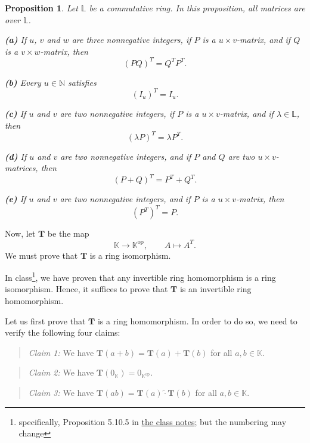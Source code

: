 \documentclass[paper=a4, fontsize=12pt]{scrartcl}%
\theoremstyle{plainsl}
\newtheorem{proposition}[theorem]{Proposition}
\theoremstyle{definition}
\theoremstyle{remark}
\newenvironment{statement}{\begin{quote}}{\end{quote}}
\begin{document}
\begin{proposition}
\label{prop.sol.ring.op.c.transp.helper}Let $\mathbb{L}$ be a commutative
ring. In this proposition, all matrices are over $\mathbb{L}$.

\textbf{(a)} If $u$, $v$ and $w$ are three nonnegative integers, if $P$ is a
$u\times v$-matrix, and if $Q$ is a $v\times w$-matrix, then%
\[
\left(  PQ\right)  ^{T}=Q^{T}P^{T}.
\]


\textbf{(b)} Every $u\in\mathbb{N}$ satisfies%
\[
\left(  I_{u}\right)  ^{T}=I_{u}.
\]


\textbf{(c)} If $u$ and $v$ are two nonnegative integers, if $P$ is a $u\times
v$-matrix, and if $\lambda\in\mathbb{L}$, then%
\[
\left(  \lambda P\right)  ^{T}=\lambda P^{T}.
\]


\textbf{(d)} If $u$ and $v$ are two nonnegative integers, and if $P$ and $Q$
are two $u\times v$-matrices, then%
\[
\left(  P+Q\right)  ^{T}=P^{T}+Q^{T}.
\]


\textbf{(e)} If $u$ and $v$ are two nonnegative integers, and if $P$ is a
$u\times v$-matrix, then%
\[
\left(  P^{T}\right)  ^{T}=P.
\]

\end{proposition}

Now, let $\mathbf{T}$ be the map%
\[
\mathbb{K}\rightarrow\mathbb{K}^{\operatorname{op}},\qquad A\mapsto A^{T}.
\]
We must prove that $\mathbf{T}$ is a ring isomorphism.

In class\footnote{specifically, Proposition 5.10.5 in
\href{http://www.cip.ifi.lmu.de/~grinberg/t/19s/notes.pdf}{the class notes};
but the numbering may change}, we have proven that any invertible ring
homomorphism is a ring isomorphism. Hence, it suffices to prove that
$\mathbf{T}$ is an invertible ring homomorphism.

Let us first prove that $\mathbf{T}$ is a ring homomorphism. In order to do
so, we need to verify the following four claims:

\begin{statement}
\textit{Claim 1:} We have $\mathbf{T}\left(  a+b\right)  =\mathbf{T}\left(
a\right)  +\mathbf{T}\left(  b\right)  $ for all $a,b\in\mathbb{K}$.
\end{statement}

\begin{statement}
\textit{Claim 2:} We have $\mathbf{T}\left(  0_{\mathbb{K}}\right)
=0_{\mathbb{K}^{\operatorname*{op}}}$.
\end{statement}

\begin{statement}
\textit{Claim 3:} We have $\mathbf{T}\left(  ab\right)  =\mathbf{T}\left(
a\right)  \left.  \widetilde{\cdot}\right.  \mathbf{T}\left(  b\right)  $ for
all $a,b\in\mathbb{K}$.
\end{statement}
\end{document}

